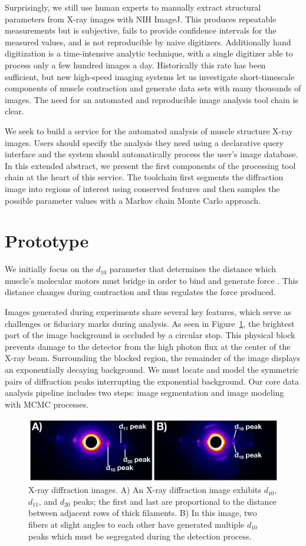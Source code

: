 \documentclass{llncs}
\newcommand{\figureimgs}{
\begin{figure}[tbp]
  \centering
  \includegraphics[width=\linewidth]{figures/x_ray_image_montage}
  \caption{\label{fig:imgs}
  	X-ray diffraction images.
    A) An X-ray diffraction image exhibits $d_{10}$, $d_{11}$, and
    $d_{20}$ peaks; the first and last are proportional to the
    distance between adjacent rows of thick filaments. B) In this
    image, two fibers at slight angles to each other have generated
    multiple $d_{10}$ peaks which must be segregated during the
    detection process.  
	}
	\vspace{-10pt}
\end{figure}
}
\begin{document}
Surprisingly, we still use human experts to manually extract
structural parameters from X-ray images with NIH ImageJ. This produces
repeatable measurements but is subjective, fails to provide confidence
intervals for the measured values, and is not reproducible by naive
digitizers. Additionally hand digitization is a time-intensive
analytic technique, with a single digitizer able to process only a few
hundred images a day.  Historically this rate has been sufficient, but
new high-speed imaging systems let us investigate short-timescale
components of muscle contraction and generate data sets with many
thousands of images. The need for an automated and reproducible image
analysis tool chain is clear. 

We seek to build a service for the automated analysis of muscle
structure X-ray images. Users should specify the analysis they need
using a declarative query interface and the system should
automatically process the user's image database. In this extended
abstract, we present the first components of the processing tool chain
at the heart of this service. The toolchain first segments the
diffraction image into regions of interest using conserved features
and then samples the possible parameter values with a Markov chain
Monte Carlo approach.


\section{Prototype}
\label{sec:proto}


We initially focus on the $d_{10}$ parameter that determines the
distance which muscle's molecular motors must bridge in order to bind
and generate force \cite{Williams2013}. This distance changes during
contraction and thus regulates the force produced.

Images generated during experiments share several key features, which
serve as challenges or fiduciary marks during analysis. As seen in
Figure~\ref{fig:imgs}, the brightest part of the image background is
occluded by a circular stop. This physical block prevents damage to
the detector from the high photon flux at the center of the X-ray
beam. Surrounding the blocked region, the remainder of the image
displays an exponentially decaying background. We must locate and
model the symmetric pairs of diffraction peaks interrupting the
exponential background. Our core data analysis pipeline includes two
steps: image segmentation and image modeling with MCMC processes.

\figureimgs
\end{document}
